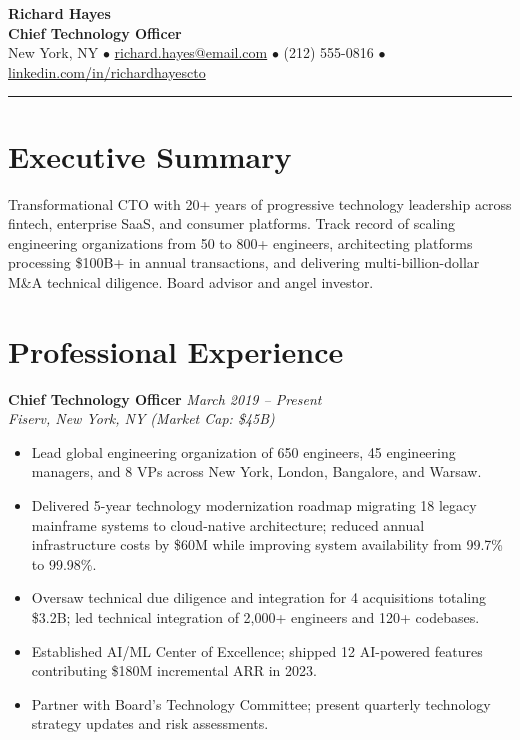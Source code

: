 \documentclass[11pt,a4paper]{article}
\begin{document}
\begin{center}
  {\LARGE \textbf{Richard Hayes}}\\[4pt]
  \textbf{Chief Technology Officer}\\[3pt]
  New York, NY \quad$\bullet$\quad
  \href{mailto:richard.hayes@email.com}{richard.hayes@email.com} \quad$\bullet$\quad
  (212) 555-0816 \quad$\bullet$\quad
  \href{https://linkedin.com/in/richardhayescto}{linkedin.com/in/richardhayescto}
\end{center}

\vspace{4pt}
\begin{center}
  \rule{0.3\textwidth}{0.4pt}
\end{center}

\section{Executive Summary}
Transformational CTO with 20+ years of progressive technology leadership across fintech, enterprise SaaS, and consumer platforms. Track record of scaling engineering organizations from 50 to 800+ engineers, architecting platforms processing \$100B+ in annual transactions, and delivering multi-billion-dollar M\&A technical diligence. Board advisor and angel investor.

\section{Professional Experience}

\noindent\textbf{Chief Technology Officer} \hfill \textit{March 2019 -- Present}\\
\textit{Fiserv, New York, NY \quad (Market Cap: \$45B)}
\begin{itemize}
  \item Lead global engineering organization of 650 engineers, 45 engineering managers, and 8 VPs across New York, London, Bangalore, and Warsaw.
  \item Delivered 5-year technology modernization roadmap migrating 18 legacy mainframe systems to cloud-native architecture; reduced annual infrastructure costs by \$60M while improving system availability from 99.7\% to 99.98\%.
  \item Oversaw technical due diligence and integration for 4 acquisitions totaling \$3.2B; led technical integration of 2,000+ engineers and 120+ codebases.
  \item Established AI/ML Center of Excellence; shipped 12 AI-powered features contributing \$180M incremental ARR in 2023.
  \item Partner with Board's Technology Committee; present quarterly technology strategy updates and risk assessments.
\end{itemize}
\end{document}
